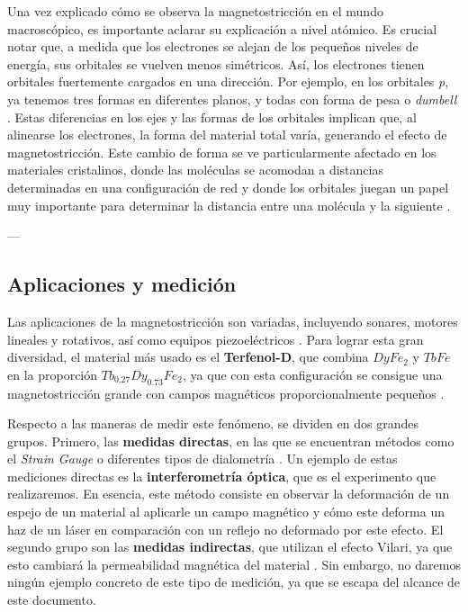 \documentclass[a4paper, amsfonts, amssymb, amsmath, reprint, showkeys, nofootinbib, twoside]{revtex4-1}
\begin{document}
Una vez explicado c\'{o}mo se observa la magnetostricci\'{o}n en el mundo macrosc\'{o}pico, es importante aclarar su explicaci\'{o}n a nivel at\'{o}mico. Es crucial notar que, a medida que los electrones se alejan de los peque\~{n}os niveles de energ\'{i}a, sus orbitales se vuelven menos sim\'{e}tricos. As\'{i}, los electrones tienen orbitales fuertemente cargados en una direcci\'{o}n. Por ejemplo, en los orbitales \textit{p}, ya tenemos tres formas en diferentes planos, y todas con forma de pesa o \textit{dumbell} \cite{callister_2000}. Estas diferencias en los ejes y las formas de los orbitales implican que, al alinearse los electrones, la forma del material total var\'{i}a, generando el efecto de magnetostricci\'{o}n. Este cambio de forma se ve particularmente afectado en los materiales cristalinos, donde las mol\'{e}culas se acomodan a distancias determinadas en una configuraci\'{o}n de red y donde los orbitales juegan un papel muy importante para determinar la distancia entre una mol\'{e}cula y la siguiente \cite{Ekreem_2007}.

---

\subsection{Aplicaciones y medici\'{o}n}

Las aplicaciones de la magnetostricci\'{o}n son variadas, incluyendo sonares, motores lineales y rotativos, as\'{i} como equipos piezoel\'{e}ctricos \cite{Ekreem_2007}. Para lograr esta gran diversidad, el material m\'{a}s usado es el \textbf{Terfenol-D}, que combina $DyFe_2$ y $TbFe$ en la proporci\'{o}n $Tb_{0.27}Dy_{0.73}Fe_2$, ya que con esta configuraci\'{o}n se consigue una magnetostricci\'{o}n grande con campos magn\'{e}ticos proporcionalmente peque\~{n}os \cite{Piercy_1997}.

Respecto a las maneras de medir este fen\'{o}meno, se dividen en dos grandes grupos. Primero, las \textbf{medidas directas}, en las que se encuentran m\'{e}todos como el \textit{Strain Gauge} o diferentes tipos de dialometr\'{i}a \cite{Ekreem_2007}. Un ejemplo de estas mediciones directas es la \textbf{interferometr\'{i}a \'{o}ptica}, que es el experimento que realizaremos. En esencia, este m\'{e}todo consiste en observar la deformaci\'{o}n de un espejo de un material al aplicarle un campo magn\'{e}tico y c\'{o}mo este deforma un haz de un l\'{a}ser en comparaci\'{o}n con un reflejo no deformado por este efecto. El segundo grupo son las \textbf{medidas indirectas}, que utilizan el efecto Vilari, ya que esto cambiar\'{a} la permeabilidad magn\'{e}tica del material \cite{Ekreem_2007}. Sin embargo, no daremos ning\'{u}n ejemplo concreto de este tipo de medici\'{o}n, ya que se escapa del alcance de este documento.
\end{document}
